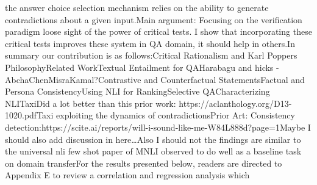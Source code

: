 \documentclass{scrbook}
\begin{document}
the answer choice selection mechanism relies on the ability to generate contradictions about a given input.Main argument: Focusing on the verification paradigm loose sight of the power of critical tests. I show that incorporating these critical tests improves these system in QA domain, it should help in others.In summary our contribution is as follows:Critical Rationalism and Karl Poppers PhilosophyRelated WorkTextual Entailment for QAHarabagu and hicks - AbchaChenMisraKamal?Contrastive and Counterfactual StatementsFactual and Persona ConsistencyUsing NLI for RankingSelective QACharacterizing NLITaxiDid a lot better than this prior work: https://aclanthology.org/D13-1020.pdfTaxi exploiting the dynamics of contradictionsPrior Art: Consistency detection:https://scite.ai/reports/will-i-sound-like-me-W84L888d?page=1Maybe I should also add discussion in here{\ldots}Also I should not the findings are similar to the universal nli few shot paper of MNLI observed to do well as a baseline task on domain transferFor the results presented below, readers are directed to Appendix E to review a correlation and regression analysis which 
\end{document}
